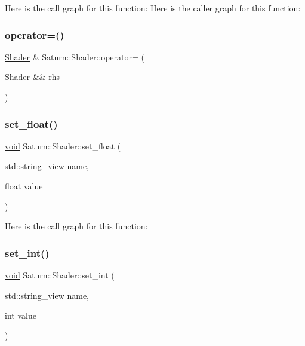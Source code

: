 Here is the call graph for this function\+:
Here is the caller graph for this function\+:
\mbox{\label{class_saturn_1_1_shader_a44c7204f9a2580073f4064af460a0b1d}} 
\subsubsection{\texorpdfstring{operator=()}{operator=()}}
{\footnotesize\ttfamily \mbox{\hyperlink{class_saturn_1_1_shader}{Shader}} \& Saturn\+::\+Shader\+::operator= (\begin{DoxyParamCaption}\item[{\mbox{\hyperlink{class_saturn_1_1_shader}{Shader}} \&\&}]{rhs }\end{DoxyParamCaption})}

\mbox{\label{class_saturn_1_1_shader_a5fe55e96741b63bca10105f492a3d735}} 
\subsubsection{\texorpdfstring{set\+\_\+float()}{set\_float()}}
{\footnotesize\ttfamily \mbox{\hyperlink{glad_8h_a950fc91edb4504f62f1c577bf4727c29}{void}} Saturn\+::\+Shader\+::set\+\_\+float (\begin{DoxyParamCaption}\item[{std\+::string\+\_\+view}]{name,  }\item[{float}]{value }\end{DoxyParamCaption})}

Here is the call graph for this function\+:
\mbox{\label{class_saturn_1_1_shader_a581b02afaa31dd07ed65e530fd742979}} 
\subsubsection{\texorpdfstring{set\+\_\+int()}{set\_int()}}
{\footnotesize\ttfamily \mbox{\hyperlink{glad_8h_a950fc91edb4504f62f1c577bf4727c29}{void}} Saturn\+::\+Shader\+::set\+\_\+int (\begin{DoxyParamCaption}\item[{std\+::string\+\_\+view}]{name,  }\item[{int}]{value }\end{DoxyParamCaption})}

